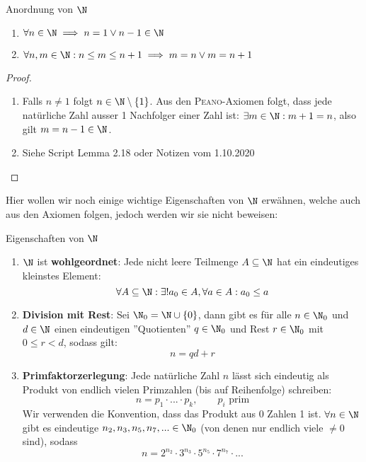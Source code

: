 \begin{lemma}{Anordnung von $\N$}{}
\begin{enumerate}[label=(\alph*)]
    \item $\forall n \in \N \implies n = 1 \lor n-1 \in \N$
    \item $\forall n,m \in \N: n \leq m \leq n+1 \implies m = n \lor m = n+1$
\end{enumerate}
\end{lemma}

\begin{proof}
\begin{enumerate}[label=(\alph*)]
    \item Falls $n \ne 1$ folgt $n \in \N \setminus \{1\}$. Aus den \textsc{Peano}-Axiomen folgt, dass jede natürliche Zahl ausser 1 Nachfolger einer Zahl ist: $\exists m \in \N: m+1 = n$, also gilt $ m = n - 1  \in \N$.
    \item Siehe Script Lemma 2.18 oder Notizen vom 1.10.2020
\end{enumerate}
\end{proof}

Hier wollen wir noch einige wichtige Eigenschaften von $\N$ erwähnen, welche auch aus den Axiomen folgen, jedoch werden wir sie nicht beweisen:
\begin{satz}{Eigenschaften von $\N$}{}
\begin{enumerate}[]
    \item $\N$ ist \textbf{wohlgeordnet}: Jede nicht leere Teilmenge $A \subseteq \N$ hat ein eindeutiges kleinstes Element:
    $$\forall A \subseteq \N: \exists! a_0 \in A, \forall a \in A: a_0 \leq a $$
    \item \textbf{Division mit Rest}: Sei $\N_0 = \N \cup \{0\}$, dann gibt es für alle $n \in \N_0$ und $d\in\N$ einen eindeutigen ''Quotienten'' $q \in \N_0$ und Rest $r \in \N_0$ mit $0 \leq r < d$, sodass gilt:
    $$n = qd + r$$
    \item \textbf{Primfaktorzerlegung}: Jede natürliche Zahl $n$ lässt sich eindeutig als Produkt von endlich vielen Primzahlen (bis auf Reihenfolge) schreiben:
    $$n = p_1\cdot ... \cdot p_k, \qquad p_i \text{ prim}$$
    Wir verwenden die Konvention, dass das Produkt aus 0 Zahlen 1 ist.
    $\forall n \in \N$ gibt es eindeutige $n_2, n_3, n_5, n_7,... \in \N_0$ (von denen nur endlich viele $\neq 0$ sind), sodass
    $$n = 2^{n_2} \cdot 3^{n_3} \cdot 5^{n_5} \cdot 7^{n_7} \cdot ...$$
\end{enumerate}
\end{satz}

